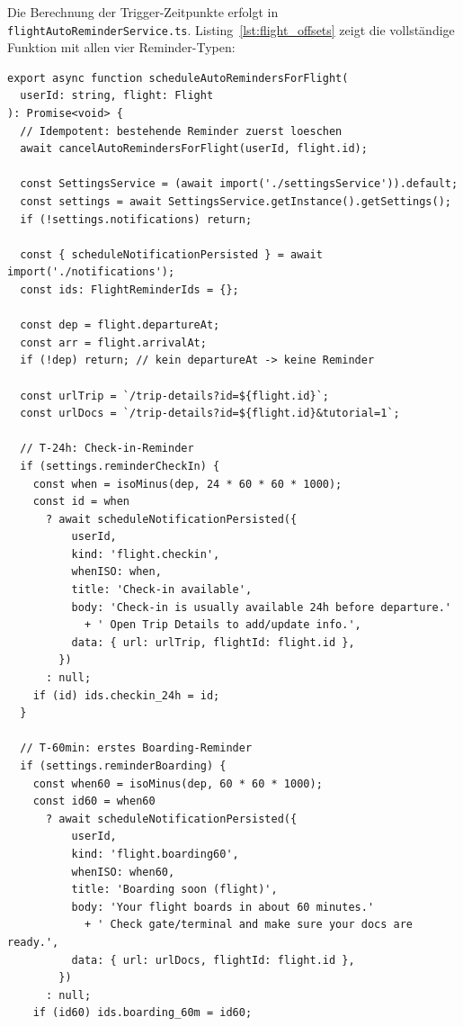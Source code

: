 Die Berechnung der Trigger-Zeitpunkte erfolgt in \texttt{flightAutoReminderService.ts}.
Listing~\ref{lst:flight_offsets} zeigt die vollständige Funktion mit allen vier
Reminder-Typen:

\begin{lstlisting}[style=skyline-ts,
  caption={Vollstaendige scheduleAutoRemindersForFlight mit allen Offsets
           (services/flightAutoReminderService.ts)},
  label={lst:flight_offsets}]
export async function scheduleAutoRemindersForFlight(
  userId: string, flight: Flight
): Promise<void> {
  // Idempotent: bestehende Reminder zuerst loeschen
  await cancelAutoRemindersForFlight(userId, flight.id);

  const SettingsService = (await import('./settingsService')).default;
  const settings = await SettingsService.getInstance().getSettings();
  if (!settings.notifications) return;

  const { scheduleNotificationPersisted } = await import('./notifications');
  const ids: FlightReminderIds = {};

  const dep = flight.departureAt;
  const arr = flight.arrivalAt;
  if (!dep) return; // kein departureAt -> keine Reminder

  const urlTrip = `/trip-details?id=${flight.id}`;
  const urlDocs = `/trip-details?id=${flight.id}&tutorial=1`;

  // T-24h: Check-in-Reminder
  if (settings.reminderCheckIn) {
    const when = isoMinus(dep, 24 * 60 * 60 * 1000);
    const id = when
      ? await scheduleNotificationPersisted({
          userId,
          kind: 'flight.checkin',
          whenISO: when,
          title: 'Check-in available',
          body: 'Check-in is usually available 24h before departure.'
            + ' Open Trip Details to add/update info.',
          data: { url: urlTrip, flightId: flight.id },
        })
      : null;
    if (id) ids.checkin_24h = id;
  }

  // T-60min: erstes Boarding-Reminder
  if (settings.reminderBoarding) {
    const when60 = isoMinus(dep, 60 * 60 * 1000);
    const id60 = when60
      ? await scheduleNotificationPersisted({
          userId,
          kind: 'flight.boarding60',
          whenISO: when60,
          title: 'Boarding soon (flight)',
          body: 'Your flight boards in about 60 minutes.'
            + ' Check gate/terminal and make sure your docs are ready.',
          data: { url: urlDocs, flightId: flight.id },
        })
      : null;
    if (id60) ids.boarding_60m = id60;


\end{lstlisting}
